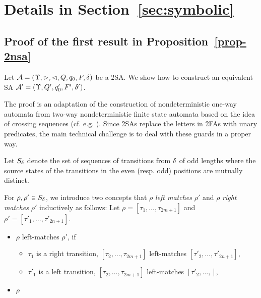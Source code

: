 
\section{Details in Section~\ref{sec:symbolic}}\label{app-sym}

\subsection{Proof of the first result in Proposition~\ref{prop-2nsa}}

Let $\mathcal{A} = (\Upsilon, \vartriangleright, \vartriangleleft, Q, q_0, F, \delta)$ be a 2SA. We show how to construct an equivalent SA $\mathcal{A}' =  (\Upsilon, Q', q'_0, F', \delta')$.

The proof is an adaptation of the  construction of nondeterministic one-way automata from two-way nondeterministic finite state automata based on the idea of crossing sequences (cf. e.g. \cite{HU79}). Since 2SAs replace the letters in 2FAs with unary predicates, the main technical challenge is to deal with these guards in a proper way.

Let $S_{\delta}$ denote the set of sequences of transitions from $\delta$ of odd lengths where the source states of the transitions in the even (resp. odd) positions are mutually distinct. 


For $\rho, \rho' \in S_{\delta}$, we introduce two concepts that $\rho$  \emph{left matches} $\rho'$ and $\rho$  \emph{right matches} $\rho'$  inductively as follows: Let $\rho = [\tau_1, \ldots, \tau_{2m+1}]$ and $\rho' = [\tau'_1, \ldots, \tau'_{2n+1}]$. 
\begin{itemize}
\item $\rho$ left-matches $\rho'$, if 
\begin{itemize}
\item $\tau_1$ is a right transition, $[\tau_2,\ldots, \tau_{2m+1}]$ left-matches $[\tau'_2, \ldots, \tau'_{2n+1}]$, 
%
\item $\tau'_1$ is a left transition, $[\tau_2, \ldots, \tau_{2m+1}]$ left-matches $[\tau'_2, \ldots, ]$, 
\end{itemize} 
\item $\rho$ 
\end{itemize}

